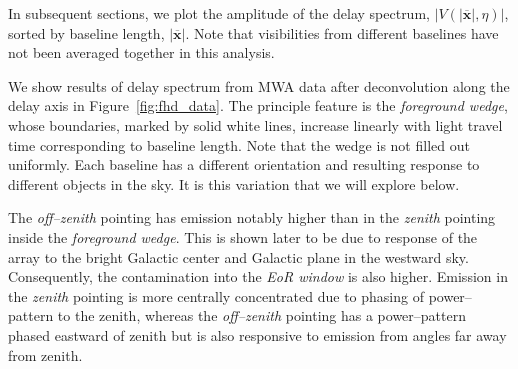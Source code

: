 \documentclass[preprint2,iop,numberedappendix]{emulateapj}
\begin{document}
In subsequent sections, we plot the amplitude of the delay spectrum, $|V(|\overline{\mathbf{x}}|,\eta)|$, sorted by baseline length, $|\overline{\mathbf{x}}|$. Note that visibilities from different baselines have not been averaged together in this analysis. 

We show results of delay spectrum from MWA data after deconvolution along the delay axis in Figure~\ref{fig:fhd_data}. The principle feature is the {\it foreground wedge}, whose boundaries, marked by solid white lines, increase linearly with light travel time corresponding to baseline length. Note that the wedge is not filled out uniformly. Each baseline has a different orientation and resulting response to different objects in the sky. It is this variation that we will explore below. 

The {\it off--zenith} pointing has emission notably higher than in the {\it zenith} pointing inside the {\it foreground wedge}. This is shown later to be due to response of the array to the bright Galactic center and Galactic plane in the westward sky. Consequently, the contamination into the {\it EoR window} is also higher. Emission in the {\it zenith} pointing is more centrally concentrated due to phasing of power--pattern to the zenith, whereas the {\it off--zenith} pointing has a power--pattern phased eastward of zenith but is also responsive to emission from angles far away from zenith. 
\end{document}

